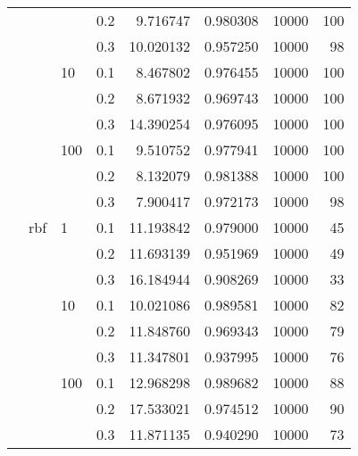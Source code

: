 \begin{table}[H]
\begin{tabular}{llllrrrr}
           &     &     & 0.2 &   9.716747 &  0.980308 &   10000 &   100 \\
           &     &     & 0.3 &  10.020132 &  0.957250 &   10000 &    98 \\
           &     & 10  & 0.1 &   8.467802 &  0.976455 &   10000 &   100 \\
           &     &     & 0.2 &   8.671932 &  0.969743 &   10000 &   100 \\
           &     &     & 0.3 &  14.390254 &  0.976095 &   10000 &   100 \\
           &     & 100 & 0.1 &   9.510752 &  0.977941 &   10000 &   100 \\
           &     &     & 0.2 &   8.132079 &  0.981388 &   10000 &   100 \\
           &     &     & 0.3 &   7.900417 &  0.972173 &   10000 &    98 \\
           & rbf & 1   & 0.1 &  11.193842 &  0.979000 &   10000 &    45 \\
           &     &     & 0.2 &  11.693139 &  0.951969 &   10000 &    49 \\
           &     &     & 0.3 &  16.184944 &  0.908269 &   10000 &    33 \\
           &     & 10  & 0.1 &  10.021086 &  0.989581 &   10000 &    82 \\
           &     &     & 0.2 &  11.848760 &  0.969343 &   10000 &    79 \\
           &     &     & 0.3 &  11.347801 &  0.937995 &   10000 &    76 \\
           &     & 100 & 0.1 &  12.968298 &  0.989682 &   10000 &    88 \\
           &     &     & 0.2 &  17.533021 &  0.974512 &   10000 &    90 \\
           &     &     & 0.3 &  11.871135 &  0.940290 &   10000 &    73 \\
\bottomrule
\end{tabular}
\end{table}
